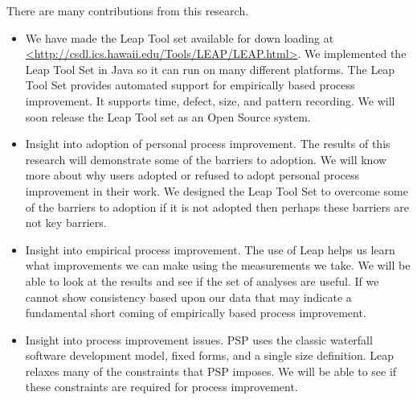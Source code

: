 \documentclass[12pt]{article}
\begin{document}
There are many contributions from this research.
\begin{itemize}
\item{We have made the Leap Tool set available for down loading at
    \url{<http://csdl.ics.hawaii.edu/Tools/LEAP/LEAP.html>}.  We
    implemented the Leap Tool Set in Java so it can run on many different
    platforms.  The Leap Tool Set provides automated support for
    empirically based process improvement.  It supports time, defect, size,
    and pattern recording.  We will soon release the Leap Tool set as an
    Open Source system.}
  
\item{Insight into adoption of personal process improvement.  The results
    of this research will demonstrate some of the barriers to adoption.  We
    will know more about why users adopted or refused to adopt personal
    process improvement in their work.  We designed the Leap Tool Set to
    overcome some of the barriers to adoption if it is not adopted then
    perhaps these barriers are not key barriers.}
  
\item{Insight into empirical process improvement.  The use of Leap helps us
    learn what improvements we can make using the measurements we take.  We
    will be able to look at the results and see if the set of analyses are
    useful.  If we cannot show consistency based upon our data that may
    indicate a fundamental short coming of empirically based process
    improvement.}
  
\item{Insight into process improvement issues.  PSP uses the classic
    waterfall software development model, fixed forms, and a single size
    definition. Leap relaxes many of the constraints that PSP imposes.  We
    will be able to see if these constraints are required for process
    improvement. }

\end{itemize}



\end{document}
